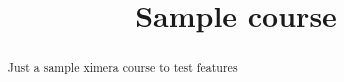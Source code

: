 \documentclass{xourse}
\title{Sample course}
\begin{document}
\begin{abstract} Just a sample ximera course to test features \end{abstract}

\maketitle

\end{document}
